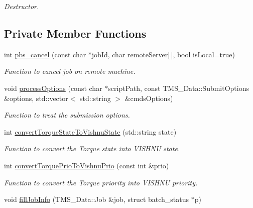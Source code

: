 \begin{DoxyCompactItemize}
\begin{DoxyCompactList}\small\item\em Destructor. \item\end{DoxyCompactList}\end{DoxyCompactItemize}
\subsection*{Private Member Functions}
\begin{DoxyCompactItemize}
\item 
int \hyperlink{classTorqueServer_a8f155d04ceea433de756c98225c053b8}{pbs\_\-cancel} (const char $\ast$jobId, char remoteServer\mbox{[}$\,$\mbox{]}, bool isLocal=true)
\begin{DoxyCompactList}\small\item\em Function to cancel job on remote machine. \item\end{DoxyCompactList}\item 
void \hyperlink{classTorqueServer_a8c8357ec45741351b28891a01fd52a3b}{processOptions} (const char $\ast$scriptPath, const TMS\_\-Data::SubmitOptions \&options, std::vector$<$ std::string $>$ \&cmdsOptions)
\begin{DoxyCompactList}\small\item\em Function to treat the submission options. \item\end{DoxyCompactList}\item 
int \hyperlink{classTorqueServer_a5fb51c751187a2bd49598aee2b0e3b18}{convertTorqueStateToVishnuState} (std::string state)
\begin{DoxyCompactList}\small\item\em Function to convert the Torque state into VISHNU state. \item\end{DoxyCompactList}\item 
int \hyperlink{classTorqueServer_a2427d2d3c69cf28f779d22396383e4d4}{convertTorquePrioToVishnuPrio} (const int \&prio)
\begin{DoxyCompactList}\small\item\em Function to convert the Torque priority into VISHNU priority. \item\end{DoxyCompactList}\item 
void \hyperlink{classTorqueServer_a0411b4c5d842efabc66e9a5db39cceba}{fillJobInfo} (TMS\_\-Data::Job \&job, struct batch\_\-status $\ast$p)

\end{DoxyCompactItemize}
